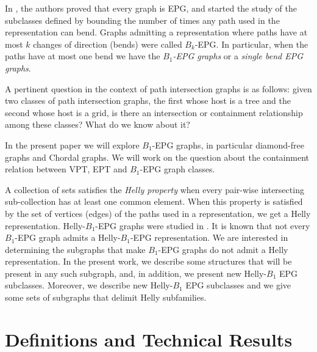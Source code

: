 \documentclass{dmgt}
\begin{document}
In \cite{golumbic2009}, the authors proved that every graph is EPG, and started the study of the subclasses
defined by bounding the number of times any path used in the representation can bend.  Graphs admitting a representation
where  paths  have at most $k$ changes of direction  (bends) were called $B_k$-EPG. 
 In particular, when the paths have at most one bend we have the \textit{ $B_1$-EPG graphs} or a \textit{single bend EPG graphs}.

 A pertinent question in the context of path intersection graphs is as follows: given two classes of path intersection graphs,
 the first whose host is a tree and the second whose host is a grid,  is there an intersection or containment relationship among these classes? What do we know about it?

In the present paper we will explore $B_1$-EPG graphs, in particular diamond-free graphs and Chordal graphs. We will work on the question about the containment
relation between  VPT, EPT and $B_1$-EPG graph classes.


 A collection  of sets satisfies the \textit{Helly property} when every pair-wise intersecting sub-collection  has at least one common element. When this property
 is satisfied by the set of vertices (edges) of the paths used in a representation, we get a Helly representation.  Helly-$B_1$-EPG graphs were studied
 in \cite{dmtcs:6506}.                                     
It is known that not every $B_1$-EPG graph admits a Helly-$B_1$-EPG representation. We are interested in determining the subgraphs that make
$B_1$-EPG graphs do not admit a Helly representation. In the present work, we describe some structures that will be present in any such subgraph,
and, in addition, we present new  Helly-$B_1$ EPG  subclasses.
Moreover,  we  describe new  Helly-$B_1$ EPG  subclasses %
and we give some sets of subgraphs that delimit Helly subfamilies.   

\section{Definitions and Technical Results}

\end{document}
